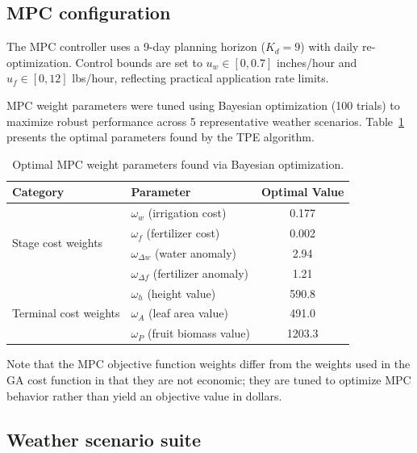 \documentclass[preprint,12pt]{elsarticle}
\begin{document}
\subsection{MPC configuration}\label{subsec:mpc-config}

The MPC controller uses a 9-day planning horizon ($K_{d} = 9$) with daily re-optimization. Control bounds are set to $u_w \in [0, 0.7]$ inches/hour and $u_f \in [0, 12]$ lbs/hour, reflecting practical application rate limits.

MPC weight parameters were tuned using Bayesian optimization (100 trials) to maximize robust performance across 5 representative weather scenarios. Table~\ref{tab:mpc-weights} presents the optimal parameters found by the TPE algorithm.

\begin{table}[ht]
\centering
\begin{tabular}{|l|l|c|}
\hline
Category & Parameter & Optimal Value \\
\hline\hline
\multirow{4}{*}{Stage cost weights}
    & $\omega_w$ (irrigation cost) & 0.177 \\
    & $\omega_f$ (fertilizer cost) & 0.002 \\
    & $\omega_{\Delta w}$ (water anomaly) & 2.94 \\
    & $\omega_{\Delta f}$ (fertilizer anomaly) & 1.21 \\
\hline
\multirow{3}{*}{Terminal cost weights}
    & $\omega_h$ (height value) & 590.8 \\
    & $\omega_A$ (leaf area value) & 491.0 \\
    & $\omega_P$ (fruit biomass value) & 1203.3 \\
\hline
\end{tabular}
\caption{Optimal MPC weight parameters found via Bayesian optimization.}
\label{tab:mpc-weights}
\end{table}

Note that the MPC objective function weights differ from the weights used in the GA cost function in that they are not economic; they are tuned to optimize MPC behavior rather than yield an objective value in dollars.

\subsection{Weather scenario suite}\label{subsec:weather-scenarios}
\end{document}
